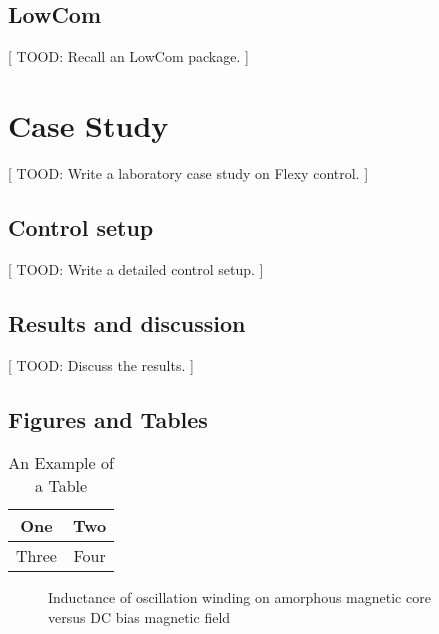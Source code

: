 \documentclass[letterpaper, 10 pt, conference]{ieeeconf}
\begin{document}
\subsection{LowCom}
\label{sec:code_mpt3lowcom}

[ TOOD: Recall an LowCom package. ]

\section{Case Study}
\label{sec:case_study}

[ TOOD: Write a laboratory case study on Flexy control. ]

\subsection{Control setup}
\label{sec:control_setup}

[ TOOD: Write a detailed control setup. ]

\subsection{Results and discussion}
\label{sec:results}

[ TOOD: Discuss the results. ]

\subsection{Figures and Tables}

\begin{table}[h]
\caption{An Example of a Table}
\label{table_example}
\begin{center}
\begin{tabular}{|c||c|}
\hline
One & Two\\
\hline
Three & Four\\
\hline
\end{tabular}
\end{center}
\end{table}


\begin{figure}[thpb]
      \centering
      \caption{Inductance of oscillation winding on amorphous
       magnetic core versus DC bias magnetic field}
      \label{figurelabel}
   \end{figure}
   
\end{document}
